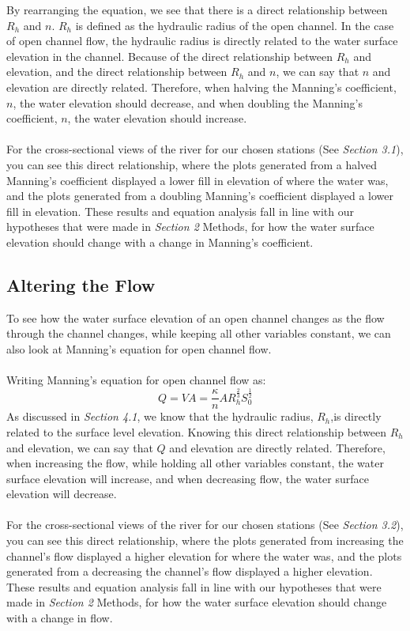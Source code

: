 \documentclass{article}
\begin{document}
\noindent By rearranging the equation, we see that there is a direct relationship between $R_h$ and $n$. $R_h$ is defined as the hydraulic radius of the open channel. In the case of open channel flow, the hydraulic radius is directly related to the water surface elevation in the channel. Because of the direct relationship between $R_h$ and elevation, and the direct relationship between $R_h$ and $n$, we can say that $n$ and elevation are directly related. Therefore, when halving the Manning's coefficient, $n$, the water elevation should decrease, and when doubling the Manning's coefficient, $n$, the water elevation should increase.\\\\
For the cross-sectional views of the river for our chosen stations (See \emph{Section 3.1}), you can see this direct relationship, where the plots generated from a halved Manning's coefficient displayed a lower fill in elevation of where the water was, and the plots generated from a doubling Manning's coefficient displayed a lower fill in elevation. These results and equation analysis fall in line with our hypotheses that were made in \emph{Section 2} Methods, for how the water surface elevation should change with a change in Manning's coefficient. 
\newpage
\subsection{Altering the Flow}
\noindent To see how the water surface elevation of an open channel changes as the flow through the channel changes, while keeping all other variables constant, we can also look at Manning's equation for open channel flow. \\\\
Writing Manning's equation for open channel flow as:
\[Q=VA=\frac{\kappa}{n}AR_h^{\frac{2}{3}}S_0^{\frac{1}{2}}\] 
\noindent As discussed in \emph{Section 4.1}, we know that the hydraulic radius, $R_h$,is directly related to the surface level elevation. Knowing this direct relationship between $R_h$ and elevation, we can say that $Q$ and elevation are directly related. Therefore, when increasing the flow, while holding all other variables constant, the water surface elevation will increase, and when decreasing flow, the water surface elevation will decrease. \\\\
For the cross-sectional views of the river for our chosen stations (See \emph{Section 3.2}), you can see this direct relationship, where the plots generated from increasing the channel's flow displayed a higher elevation for where the water was, and the plots generated from a decreasing the channel's flow displayed a higher elevation. These results and equation analysis fall in line with our hypotheses that were made in \emph{Section 2} Methods, for how the water surface elevation should change with a change in flow.  
\newpage
\end{document}
